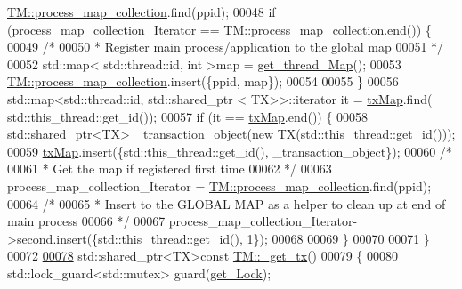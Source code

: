 \begin{DoxyCode}
      \hyperlink{class_t_m_a81c3bd28ad2343a620fa070f8ac186ca_a81c3bd28ad2343a620fa070f8ac186ca}{TM::process\_map\_collection}.find(ppid);
00048     \textcolor{keywordflow}{if} (process\_map\_collection\_Iterator == \hyperlink{class_t_m_a81c3bd28ad2343a620fa070f8ac186ca_a81c3bd28ad2343a620fa070f8ac186ca}{TM::process\_map\_collection}.end()) \{
00049         \textcolor{comment}{/*}
00050 \textcolor{comment}{         * Register main process/application to the global map}
00051 \textcolor{comment}{         */}
00052         std::map< std::thread::id, int >map = \hyperlink{class_t_m_afb8bc9f42fe06c52747beb7f4c46915c_afb8bc9f42fe06c52747beb7f4c46915c}{get\_thread\_Map}();
00053         \hyperlink{class_t_m_a81c3bd28ad2343a620fa070f8ac186ca_a81c3bd28ad2343a620fa070f8ac186ca}{TM::process\_map\_collection}.insert(\{ppid, map\});
00054 
00055     \}
00056     std::map<std::thread::id, std::shared\_ptr < TX>>::iterator it = \hyperlink{class_t_m_a0333dfa193ea99d7626de74a2b932e9b_a0333dfa193ea99d7626de74a2b932e9b}{txMap}.find(
      std::this\_thread::get\_id());
00057     \textcolor{keywordflow}{if} (it == \hyperlink{class_t_m_a0333dfa193ea99d7626de74a2b932e9b_a0333dfa193ea99d7626de74a2b932e9b}{txMap}.end()) \{
00058         std::shared\_ptr<TX> \_transaction\_object(\textcolor{keyword}{new} \hyperlink{class_t_x}{TX}(std::this\_thread::get\_id()));
00059         \hyperlink{class_t_m_a0333dfa193ea99d7626de74a2b932e9b_a0333dfa193ea99d7626de74a2b932e9b}{txMap}.insert(\{std::this\_thread::get\_id(), \_transaction\_object\});
00060         \textcolor{comment}{/*}
00061 \textcolor{comment}{         * Get the map if registered first time}
00062 \textcolor{comment}{         */}
00063         process\_map\_collection\_Iterator = \hyperlink{class_t_m_a81c3bd28ad2343a620fa070f8ac186ca_a81c3bd28ad2343a620fa070f8ac186ca}{TM::process\_map\_collection}.find(ppid);
00064         \textcolor{comment}{/*}
00065 \textcolor{comment}{         * Insert to the GLOBAL MAP as a helper to clean up at end of main process }
00066 \textcolor{comment}{         */}
00067         process\_map\_collection\_Iterator->second.insert(\{std::this\_thread::get\_id(), 1\});
00068 
00069     \}
00070 
00071 \}
00072 
\hypertarget{_t_m_8cpp_source.tex_l00078}{}\hyperlink{class_t_m_a41cb0226cc4080c931651b13f74a0075_a41cb0226cc4080c931651b13f74a0075}{00078} std::shared\_ptr<TX>\textcolor{keyword}{const} \hyperlink{class_t_m_a41cb0226cc4080c931651b13f74a0075_a41cb0226cc4080c931651b13f74a0075}{TM::\_get\_tx}()
00079 \{
00080     std::lock\_guard<std::mutex> guard(\hyperlink{class_t_m_a123bc5aa0766a7b909bebc54a429e5b0_a123bc5aa0766a7b909bebc54a429e5b0}{get\_Lock});

\end{DoxyCode}
